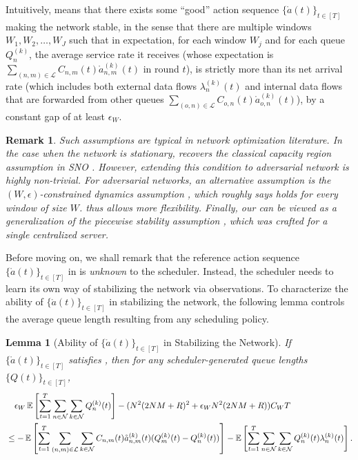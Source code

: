 \documentclass[11pt,fullpage,letterpaper]{article} %
\newtheorem{lemma}[theorem]{Lemma}
\newtheorem{remark}{Remark}
\renewcommand{\bm}[1]{#1}%
\newcommand{\E}{\operatornamewithlimits{\mathbb{E}}}
\newcommand{\mN}{{\mathcal N}}
\newcommand{\mL}{{\mathcal L}}
\begin{document}
Intuitively,  means that there exists some ``good'' action sequence $\{\mathring{\bm a}(t)\}_{t\in [T]}$ making the network stable, in the sense that there are multiple windows $W_1,W_2,\ldots,W_J$ such that in expectation, for each window $W_j$ and for each queue $Q_n^{(k)}$, the average service rate it receives (whose expectation is $\sum_{(n,m)\in \mL} C_{n,m}(t) \mathring a_{n,m}^{(k)}(t)$ in round $t$), is strictly more than its net arrival rate (which includes both external data flows $\lambda_n^{(k)}(t)$ and internal data flows that are forwarded from other queues $\sum_{(o,n)\in \mL} C_{o,n}(t) \mathring{a}_{o,n}^{(k)}(t)$), by a constant gap of at least $\epsilon_W$.

\begin{remark}\label{remark:assumption}
Such assumptions are typical in network optimization literature. In the case when the network is stationary,  recovers the classical capacity region assumption in SNO  \citep{neely2010stochastic}.
However, extending this condition to adversarial network is highly non-trivial.
For adversarial networks, an alternative assumption is the $(W,\epsilon)$-constrained dynamics assumption \citep{liang2018minimizing}, which roughly says  holds for every window of size $W$.  thus allows more flexibility.
Finally, our  can be viewed as a generalization of the piecewise stability assumption \citep{huang2023queue}, which was crafted for a single centralized server.
\end{remark}

Before moving on, we shall remark that the reference action sequence $\{\mathring{\bm a}(t)\}_{t\in [T]}$ in  is \textit{unknown} to the scheduler. Instead, the scheduler needs to learn its own way of stabilizing the network via observations. 
To characterize the ability of $\{\mathring{\bm a}(t)\}_{t\in [T]}$ in stabilizing the network, the following lemma controls the average queue length resulting from any scheduling policy.
\begin{lemma}[Ability of $\{\mathring{\bm a}(t)\}_{t\in [T]}$ in Stabilizing the Network]\label{lem:multi-hop stability network stability}
If $\{\mathring{\bm a}(t)\}_{t\in [T]}$ satisfies , then for any scheduler-generated queue lengths $\{\bm Q(t)\}_{t\in [T]}$,
\begin{align*}
&\quad \epsilon_W \E\left [\sum_{t=1}^T \sum_{n\in \mN} \sum_{k\in \mN} Q_n^{(k)}(t)\right ] - (N^2 (2NM+R)^2 + \epsilon_W N^2 (2NM+R)) C_W T \\
&\le-\E\left [\sum_{t=1}^T \sum_{(n,m)\in \mL} \sum_{k\in \mN} C_{n,m}(t) \mathring{a}_{n,m}^{(k)}(t) (Q_m^{(k)}(t) - Q_n^{(k)}(t))\right ]-\E\left [\sum_{t=1}^T \sum_{n\in \mN} \sum_{k\in \mN} Q_n^{(k)}(t) \lambda_n^{(k)}(t)\right ].
\end{align*}
\end{lemma}
\end{document}
